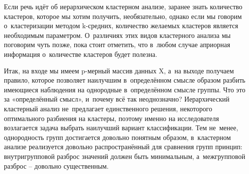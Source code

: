 \documentclass[12pt,a4paper]{article}
\theoremstyle{definition}
\begin{document}
Если речь идёт об иерархическом кластерном анализе, заранее знать количество кластеров, 
которое мы хотим получить, необязательно, однако если мы говорим о~кластеризации методом 
$\text{k}$-средних, количество желаемых кластеров является необходимым параметром. 
О~различиях этих видов кластерного анализа мы поговорим чуть позже, пока стоит 
отметить, что в~любом случае априорная информация о~количестве кластеров будет 
полезна.

Итак, на входе мы имеем $\text{p}$-мерный массив данных $\text{X}$, а~на выходе получаем 
правило, которое позволяет наилучшим в~определённом смысле образом разбить имеющиеся 
наблюдения на однородные в~определённом смысле группы. Что это за «определённый 
смысл», и~почему всё так неоднозначно? Иерархический кластерный анализ не~предлагает 
единственного решения, некоторого оптимального разбиения на кластеры, поэтому именно 
на исследователя возлагается задача выбрать наилучший вариант классификации. 
Тем не~менее, однородность групп достигается довольно понятным образом, в~кластерном 
анализе реализуется довольно распространённый для сравнения групп принцип: 
внутригрупповой разброс значений должен быть минимальным, а~межгрупповой 
разброс – довольно существенным.
\end{document}

